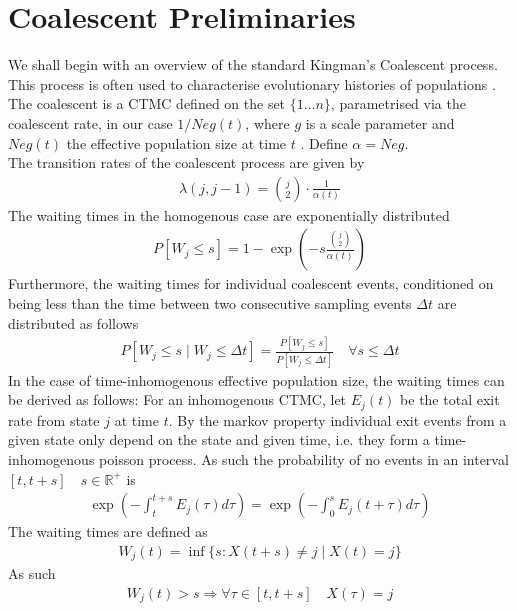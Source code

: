 \documentclass{report}
\newcommand{\R}{\mathbb{R}}
\theoremstyle{definition}
\begin{document}
\section{Coalescent Preliminaries}
We shall begin with an overview of the standard Kingman's Coalescent process\cite{kingman_coalescent_1982}. This process is often used to characterise evolutionary histories of populations \cite{drummond_estimating_2002,hein_gene_2004,ho_skyline-plot_2011}.
The coalescent is a CTMC defined on the set $\{1 ... n\}$, parametrised via the coalescent rate, in our case $1/Neg(t)$, where $g$ is a scale parameter and $Neg(t)$ the effective population size at time $t$ \cite{drummond_estimating_2002,hein_gene_2004}. Define $\alpha = Neg$.\\
The transition rates of the coalescent process are given by 
\begin{gather*}
\lambda(j, j-1) = \binom{j}{2}\cdot\frac{1}{\alpha(t)}
\end{gather*}
The waiting times in the homogenous case are exponentially distributed
\begin{gather*}
P[W_j \leq s] = 1-\exp(-s\frac{\binom{j}{2}}{\alpha(t)})
\end{gather*}
Furthermore, the waiting times for individual coalescent events, conditioned on being less than the time between two consecutive sampling events $\Delta t$ are distributed as follows
\begin{gather}\label{eq:conditional}
P[W_j \leq s\mid W_j \leq \Delta t ] = \frac{P[W_j \leq s]}{P[W_j \leq \Delta t]} \quad\forall s \leq \Delta t
\end{gather}
In the case of time-inhomogenous effective population size, the waiting times can be derived as follows:
For an inhomogenous CTMC, let $E_j(t)$ be the total exit rate from state $j$ at time $t$.
By the markov property individual exit events from a given state only depend on the state and given time, i.e. they form a time-inhomogenous poisson process.
As such the probability of no events in an interval $[t,t+s]\quad s\in \R^+$ is 
\begin{gather}
\exp(-\int_t^{t+s}E_j(\tau)d\tau) = \exp(-\int_0^{s}E_j(t+\tau)d\tau)
\end{gather}
The waiting times are defined as
\begin{gather}
W_j(t) = \inf\{s:X(t+s)\neq j \mid X(t) = j\}
\end{gather}
As such
\begin{gather}
W_j(t) > s \Rightarrow \forall \tau\in[t, t+s]\quad X(\tau) = j
\end{gather}
\end{document}

